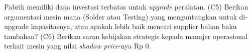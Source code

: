 \documentclass[11pt, a4paper]{article}
\begin{document}
Pabrik memiliki dana investasi terbatas untuk \textit{upgrade} peralatan.
(C5) Berikan argumentasi mesin mana (Solder atau Testing) yang menguntungkan untuk di-upgrade kapasitasnya, atau apakah lebih baik mencari supplier bahan baku tambahan? 
(C6) Berikan saran kebijakan strategis kepada manajer operasional terkait mesin yang nilai \textit{shadow price}-nya Rp 0.
\end{document}
